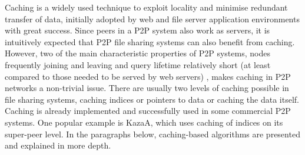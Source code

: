 %
%
Caching is a widely used technique to exploit locality and minimise redundant
transfer of data, initially adopted by web and file server application
environments with great success. Since peers in a P2P system also work as
servers, it is intuitively expected that P2P file sharing systems can also
benefit from caching. However, two of the main characteristic properties of P2P
systems, nodes frequently joining and leaving and query lifetime relatively
short (at least compared to those needed to be served by web servers) , makes
caching in P2P networks a non-trivial issue. There are usually two levels of
caching possible in file sharing systems, caching indices or pointers to data or
caching the data itself. Caching is already implemented and successfully used in
some commercial P2P systems. One popular example is KazaA, which uses caching of
indices on its super-peer level. In the paragraphs below, caching-based
algorithms are presented and explained in more depth.

